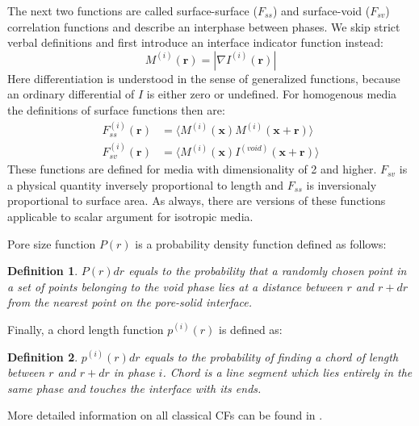 \documentclass[1p]{elsarticle}
\newtheorem{definition}{Definition}
\begin{document}
The next two functions are called surface-surface ($F_{ss}$) and surface-void
($F_{sv}$) correlation functions and describe an interphase between phases. We
skip strict verbal definitions and first introduce an interface indicator
function instead:
\begin{equation*}
  M^{(i)}(\bm{r}) = | \nabla I^{(i)}(\bm{r}) |
\end{equation*}
Here differentiation is understood in the sense of generalized functions,
because an ordinary differential of $I$ is either zero or undefined. For
homogenous media the definitions of surface functions then are:
\begin{align}
  F_{ss}^{(i)}(\bm{r}) &= \langle M^{(i)}(\bm{x}) M^{(i)}(\bm{x} +
  \bm{r}) \rangle \label{eq:fss-def} \\
  F_{sv}^{(i)}(\bm{r}) &= \langle M^{(i)}(\bm{x}) I^{(void)}(\bm{x}
  + \bm{r}) \rangle \label{eq:fsv-def}
\end{align}
These functions are defined for media with dimensionality of 2 and
higher. $F_{sv}$ is a physical quantity inversely proportional to length and
$F_{ss}$ is inversionaly proportional to surface area. As always, there are
versions of these functions applicable to scalar argument for isotropic media.

Pore size function $P(r)$ is a probability density function defined as follows:
\begin{definition}
  $P(r)dr$ equals to the probability that a randomly chosen point in a set of
  points belonging to the void phase lies at a distance between $r$ and $r + dr$
  from the nearest point on the pore-solid interface.
\end{definition}

Finally, a chord length function $p^{(i)}(r)$ is defined as:
\begin{definition}
  $p^{(i)}(r)dr$ equals to the probability of finding a chord of length between
  $r$ and $r+dr$ in phase $i$. Chord is a line segment which lies entirely in
  the same phase and touches the interface with its ends.
\end{definition}

More detailed information on all classical CFs can be found in
\cite{Torquato_book}.
\end{document}

